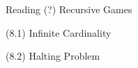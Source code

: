\documentclass[handout]{mcs}
\begin{document}


\begin{staffnotes}

Reading (?) Recursive Games

(8.1) Infinite Cardinality

(8.2) Halting Problem

\end{staffnotes}











\end{document}
